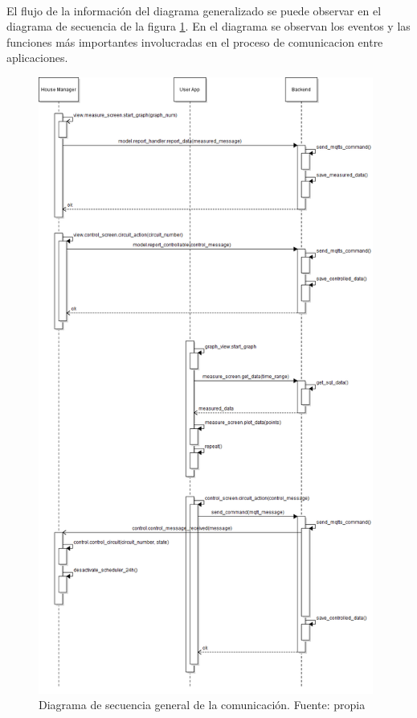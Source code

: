 \vspace{0.5cm}\\
El flujo de la información del diagrama generalizado se puede observar en el diagrama de secuencia de la figura \ref{secuencia}. En el diagrama se observan los eventos y las funciones más importantes involucradas en el proceso de comunicacion entre aplicaciones.
\begin{figure}[htbp]
	\centering
	\includegraphics[width=11cm]{figuras/secuencia.png}
	\caption{Diagrama de secuencia general de la comunicación. Fuente: propia}	
	\label{secuencia}
\end{figure}

